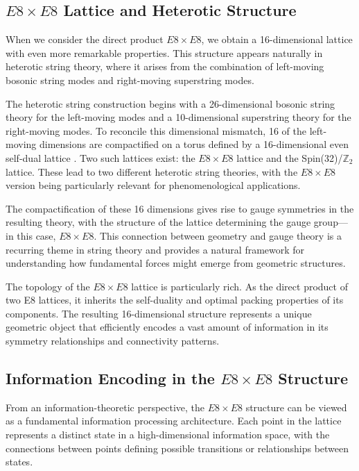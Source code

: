 \documentclass[11pt,english,twoside]{article}
\begin{document}
\subsection{$E8\times E8$ Lattice and Heterotic Structure}

When we consider the direct product $E8\times E8$, we obtain a 16-dimensional lattice with even more remarkable properties. This structure appears naturally in heterotic string theory, where it arises from the combination of left-moving bosonic string modes and right-moving superstring modes.

The heterotic string construction begins with a 26-dimensional bosonic string theory for the left-moving modes and a 10-dimensional superstring theory for the right-moving modes. To reconcile this dimensional mismatch, 16 of the left-moving dimensions are compactified on a torus defined by a 16-dimensional even self-dual lattice \cite{Conway1991}. Two such lattices exist: the $E8\times E8$ lattice and the Spin(32)/$\mathbb{Z}_2$ lattice. These lead to two different heterotic string theories, with the $E8\times E8$ version being particularly relevant for phenomenological applications.

The compactification of these 16 dimensions gives rise to gauge symmetries in the resulting theory, with the structure of the lattice determining the gauge group---in this case, $E8\times E8$. This connection between geometry and gauge theory is a recurring theme in string theory and provides a natural framework for understanding how fundamental forces might emerge from geometric structures.

The topology of the $E8\times E8$ lattice is particularly rich. As the direct product of two E8 lattices, it inherits the self-duality and optimal packing properties of its components. The resulting 16-dimensional structure represents a unique geometric object that efficiently encodes a vast amount of information in its symmetry relationships and connectivity patterns.

\subsection{Information Encoding in the $E8\times E8$ Structure}

From an information-theoretic perspective, the $E8\times E8$ structure can be viewed as a fundamental information processing architecture. Each point in the lattice represents a distinct state in a high-dimensional information space, with the connections between points defining possible transitions or relationships between states.
\end{document}
